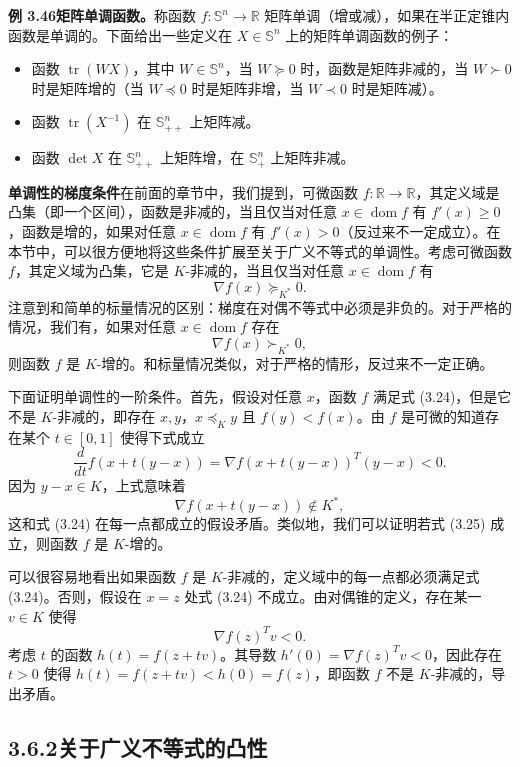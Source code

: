 \documentclass[UTF8, 12pt, fontset=fandol, oneside]{ctexart}
\DeclareMathOperator{\dom}{dom}
\begin{document}
\noindent\textbf{例 3.46\quad 矩阵单调函数。}\quad 称函数 $f:\mathbb{S}^n\to\mathbb{R}$ 矩阵单调（增或减），如果在半正定锥内函数是单调的。下面给出一些定义在 $X\in\mathbb{S}^n$ 上的矩阵单调函数的例子：
\begin{itemize}
\item 函数 $\operatorname{tr}(WX)$，其中 $W\in\mathbb{S}^n$，当 $W\succeq0$ 时，函数是矩阵非减的，当 $W\succ0$ 时是矩阵增的（当 $W\preceq0$ 时是矩阵非增，当 $W\prec0$ 时是矩阵减）。
\item 函数 $\operatorname{tr}(X^{-1})$ 在 $\mathbb{S}_{++}^n$ 上矩阵减。
\item 函数 $\det X$ 在 $\mathbb{S}_{++}^n$ 上矩阵增，在 $\mathbb{S}_+^n$ 上矩阵非减。
\end{itemize}

\noindent\textbf{单调性的梯度条件}\quad 在前面的章节中，我们提到，可微函数 $f:\mathbb{R}\to\mathbb{R}$，其定义域是凸集（即一个区间），函数是非减的，当且仅当对任意 $x\in\dom f$ 有 $f'(x)\geq0$，函数是增的，如果对任意 $x\in\dom f$ 有 $f'(x)>0$（反过来不一定成立）。在本节中，可以很方便地将这些条件扩展至关于广义不等式的单调性。考虑可微函数 $f$，其定义域为凸集，它是 $K$-非减的，当且仅当对任意 $x\in\dom f$ 有
\begin{equation}
\nabla f(x)\succeq_{K^*}0.
\tag{3.24}
\end{equation}
注意到和简单的标量情况的区别：梯度在对偶不等式中必须是非负的。对于严格的情况，我们有，如果对任意 $x\in\dom f$ 存在
\begin{equation}
\nabla f(x)\succ_{K^*}0,
\tag{3.25}
\end{equation}
则函数 $f$ 是 $K$-增的。和标量情况类似，对于严格的情形，反过来不一定正确。

下面证明单调性的一阶条件。首先，假设对任意 $x$，函数 $f$ 满足式 (3.24)，但是它不是 $K$-非减的，即存在 $x,y$，$x\preceq_K y$ 且 $f(y)<f(x)$。由 $f$ 是可微的知道存在某个 $t\in[0,1]$ 使得下式成立
\[
\frac{d}{dt}f(x+t(y-x))=\nabla f(x+t(y-x))^T(y-x)<0.
\]
因为 $y-x\in K$，上式意味着
\[
\nabla f(x+t(y-x))\notin K^*,
\]
这和式 (3.24) 在每一点都成立的假设矛盾。类似地，我们可以证明若式 (3.25) 成立，则函数 $f$ 是 $K$-增的。

可以很容易地看出如果函数 $f$ 是 $K$-非减的，定义域中的每一点都必须满足式 (3.24)。否则，假设在 $x=z$ 处式 (3.24) 不成立。由对偶锥的定义，存在某一 $v\in K$ 使得
\[
\nabla f(z)^Tv<0.
\]
考虑 $t$ 的函数 $h(t)=f(z+tv)$。其导数 $h'(0)=\nabla f(z)^Tv<0$，因此存在 $t>0$ 使得 $h(t)=f(z+tv)<h(0)=f(z)$，即函数 $f$ 不是 $K$-非减的，导出矛盾。

\subsection*{3.6.2\quad 关于广义不等式的凸性}
\end{document}
